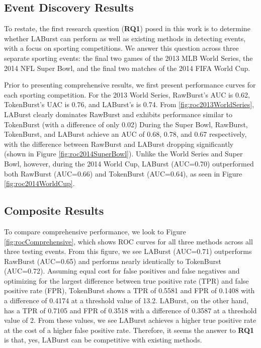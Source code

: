 \documentclass[letterpaper]{article}
\begin{document}
\subsection{Event Discovery Results}

To restate, the first research question (\textbf{RQ1}) posed in this work is to determine whether LABurst can perform as well as existing methods in detecting events, with a focus on sporting competitions.
We answer this question across three separate sporting events: the final two games of the 2013 MLB World Series, the 2014 NFL Super Bowl, and the final two matches of the 2014 FIFA World Cup.

Prior to presenting comprehensive results, we first present performance curves for each sporting competition.
For the 2013 World Series, RawBurst's AUC is 0.62, TokenBurst's UAC is 0.76, and LABurst's is 0.74. 
From \ref{fig:roc2013WorldSeries}, LABurst clearly dominates RawBurst and exhibits performance similar to TokenBurst (with a difference of only 0.02)
During the Super Bowl, RawBurst, TokenBurst, and LABurst achieve an AUC of 0.68, 0.78, and 0.67 respectively, with the difference between RawBurst and LABurst dropping significantly (shown in Figure \ref{fig:roc2014SuperBowl}).
Unlike the World Series and Super Bowl, however, during the 2014 World Cup, LABurst (AUC=0.70) outperformed both RawBurst (AUC=0.66) and TokenBurst (AUC=0.64), as seen in Figure \ref{fig:roc2014WorldCup}.

\subsection{Composite Results}

To compare comprehensive performance, we look to Figure \ref{fig:rocComprehensive}, which shows ROC curves for all three methods across all three testing events.
From this figure, we see LABurst (AUC=0.71) outperforms RawBurst (AUC=0.65) and performs nearly identically to TokenBurst (AUC=0.72).
Assuming equal cost for false positives and false negatives and optimizing for the largest difference between true positive rate (TPR) and false positive rate (FPR), TokenBurst shows a TPR of 0.5581 and FPR of 0.1408 with a difference of 0.4174 at a threshold value of 13.2.
LABurst, on the other hand, has a TPR of 0.7105 and FPR of 0.3518 with a difference of 0.3587 at a threshold value of 2.
From these values, we see LABurst achieves a higher true positive rate at the cost of a higher false positive rate.
Therefore, it seems the answer to \textbf{RQ1} is that, yes, LABurst can be competitive with existing methods.
\end{document}
